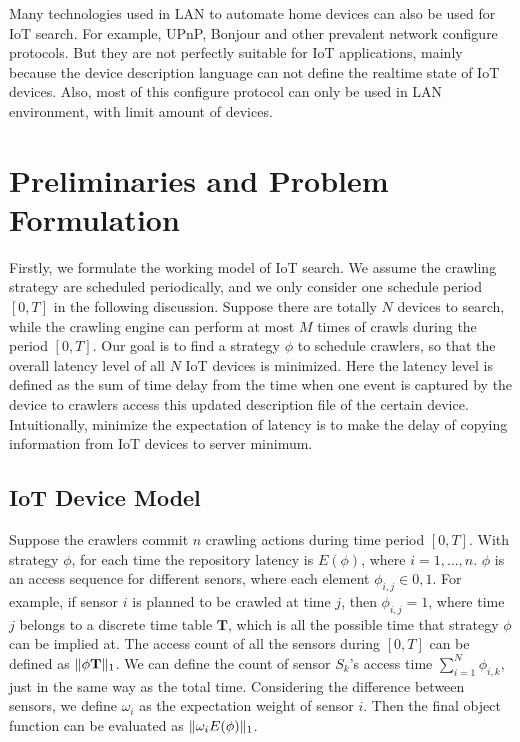 \documentclass[conference]{IEEEtran}
\begin{document}
Many technologies used in LAN to automate home devices can also be used for IoT search. For example, UPnP\cite{UPnP}, Bonjour\cite{Bonjour} and other prevalent network configure protocols. But they are not perfectly suitable for IoT applications, mainly because the device description language can not define the realtime state of IoT devices. Also, most of this configure protocol can only be used in LAN environment, with limit amount of devices.

\section{Preliminaries and Problem Formulation}
Firstly, we formulate the working model of IoT search. We assume the crawling strategy are scheduled periodically, and we only consider one schedule period $[0, T]$ in the following discussion. Suppose there are totally $N$ devices to search, while the crawling engine can perform at most $M$ times of crawls during the period $[0, T]$. Our goal is to find a strategy $\phi$ to schedule crawlers, so that the overall latency level of all $N$ IoT devices is minimized.
Here the latency level is defined as the sum of time delay from the time when one event is captured by the device to crawlers access this updated description file of the certain device. Intuitionally, minimize the expectation of latency is to make the delay of copying information from IoT devices to server minimum. 

\subsection{IoT Device Model}
Suppose the crawlers commit $n$ crawling actions during time period $[0, T]$. With strategy $\phi$, for each time the repository latency is $E(\phi)$, where $i=1,\ldots,n$. 
$\phi$ is an access sequence for different senors, where each element $\phi_{i,j}\in{0,1}$. For example, if sensor $i$ is planned to be crawled at time $j$, then $\phi_{i,j}=1$, where time $j$ belongs to a discrete time table $\mathbf{T}$, which is all the possible time that strategy $\phi$ can be implied at.
The access count of all the sensors during $[0, T]$ can be defined as $\Arrowvert\phi\mathbf{T} \Arrowvert_{1}$. We can define the count of sensor $S_k$'s access time $\sum_{i=1}^{N}\phi_{i,k}$, just in the same way as the total time. 
Considering the difference between sensors, we define $\omega_i$ as the expectation weight of sensor $i$. Then the final object function can be evaluated as $\Arrowvert \omega_i E(\phi) \Arrowvert_{1}$.
\end{document}
